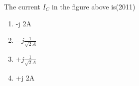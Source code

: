     

\item  The current $I_C$ in the figure above is\hfill{(2011)}
   \begin{multicols}{4}
            \begin{enumerate}
            \item -j 2A
            \item $-j \frac{1}{\sqrt{2}A}$
            \item  $+j \frac{1}{\sqrt{2}A}$
            \item +j 2A
            \end{enumerate}
             \end{multicols}
       
    
        
 
